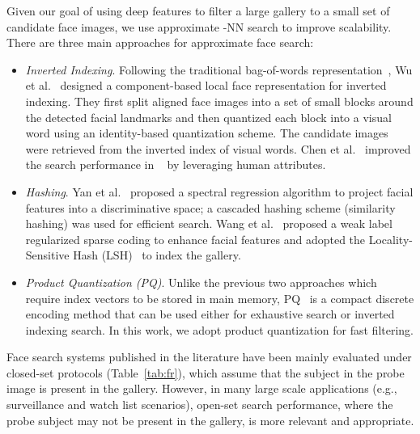 \documentclass[10pt,journal,compsoc]{IEEEtran}
\begin{document}
Given our goal of using deep features to filter a large gallery to a small set of candidate face images, we use approximate -NN search to improve scalability. There are three main approaches for approximate face search:
\begin{itemize}
  \item \emph{Inverted Indexing}. Following the traditional bag-of-words representation~\cite{cbir}, Wu et al.~\cite{faceretrieval:wu2010} designed a component-based local face representation for inverted indexing. They first split aligned face images into a set of small blocks around the detected facial landmarks and then quantized each block into a visual word using an identity-based quantization scheme. The candidate images were retrieved from the inverted index of visual words. Chen et al.~\cite{faceretrieval:chen2012} improved the search performance in ~\cite{faceretrieval:wu2010} by leveraging human attributes.
  \item \emph{Hashing}. Yan et al.~\cite{fr:sh} proposed a spectral regression algorithm to project facial features into a discriminative space; a cascaded hashing scheme (similarity hashing) was used for efficient search. Wang et al.~\cite{SELF:TPAMI:WLRLCC} proposed a weak label regularized sparse coding to enhance facial features and adopted the Locality-Sensitive Hash (LSH)~\cite{retrieval:LSH} to index the gallery.
  \item \emph{Product Quantization (PQ)}. Unlike the previous two approaches which require index vectors to be stored in main memory, PQ~\cite{retrieval:pq} is a compact discrete encoding method that can be used either for exhaustive search or inverted indexing search. In this work, we adopt product quantization for fast filtering.
\end{itemize}

Face search systems published in the literature have been mainly evaluated under closed-set protocols (Table~\ref{tab:fr}), which assume that the subject in the probe image is present in the gallery. However, in many large scale applications (e.g., surveillance and watch list scenarios), open-set search performance, where the probe subject may not be present in the gallery, is more relevant and appropriate.
\end{document}
